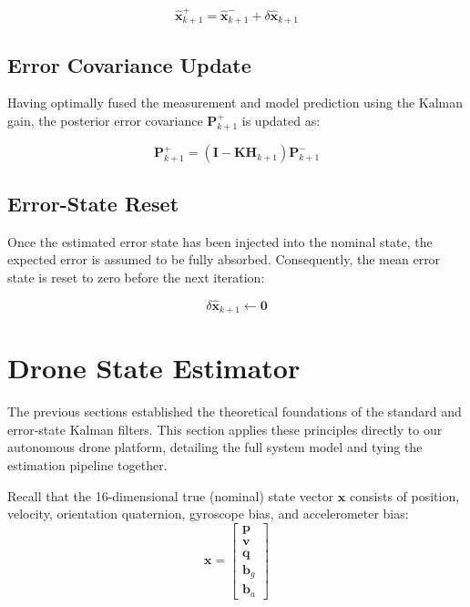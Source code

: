 \documentclass{article}
\begin{document}
	\begin{equation}
		\hat{\mathbf{x}}_{k+1}^+ = \hat{\mathbf{x}}_{k+1}^- + \delta\hat{\mathbf{x}}_{k+1}
	\end{equation}
	
	\subsection{Error Covariance Update}
	
	Having optimally fused the measurement and model prediction using the Kalman gain, the posterior error covariance $\mathbf{P}_{k+1}^+$ is updated as:
	
	\begin{equation}
		\mathbf{P}_{k+1}^+ = (\mathbf{I} - \mathbf{K} \mathbf{H}_{k+1}) \mathbf{P}_{k+1}^-
		\label{eq:cov_update}
	\end{equation}
	
	\subsection{Error-State Reset}
	
	Once the estimated error state has been injected into the nominal state, the expected error is assumed to be fully absorbed. Consequently, the mean error state is reset to zero before the next iteration:
	
	\begin{equation}
		\delta\hat{\mathbf{x}}_{k+1} \leftarrow \mathbf{0}
	\end{equation}
	
	\section{Drone State Estimator}
	
	The previous sections established the theoretical foundations of the standard and error-state Kalman filters. This section applies these principles directly to our autonomous drone platform, detailing the full system model and tying the estimation pipeline together.
	
	Recall that the 16-dimensional true (nominal) state vector $\mathbf{x}$ consists of position, velocity, orientation quaternion, gyroscope bias, and accelerometer bias:
	\begin{equation*}
		\mathbf{x} =
		\begin{bmatrix}
			\mathbf{p} \\
			\mathbf{v} \\
			\mathbf{q} \\
			\mathbf{b}_g \\
			\mathbf{b}_a
		\end{bmatrix}
	\end{equation*}
	
\end{document}
